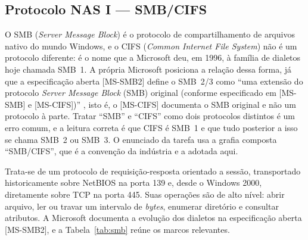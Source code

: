 \documentclass[11pt,a4paper]{article}
\begin{document}
\subsection{Protocolo NAS I --- SMB/CIFS}
\label{sec:smb}

O SMB (\textit{Server Message Block}) é o protocolo de compartilhamento de arquivos nativo do mundo
Windows, e o CIFS (\textit{Common Internet File System}) não é um protocolo diferente: é o nome que a
Microsoft deu, em 1996, à família de dialetos hoje chamada SMB~1. A própria Microsoft posiciona a
relação dessa forma, já que a especificação aberta [MS-SMB2] define o SMB~2/3 como ``uma extensão do
protocolo \textit{Server Message Block} (SMB) original (conforme especificado em [MS-SMB] e
[MS-CIFS])'' \cite{mssmb2ovw}, isto é, o [MS-CIFS] documenta o SMB original e não um protocolo à
parte. Tratar ``SMB'' e ``CIFS'' como dois protocolos distintos é um erro comum, e a leitura correta
é que CIFS é SMB~1 e que tudo posterior a isso se chama SMB~2 ou SMB~3. O enunciado da tarefa usa a
grafia composta ``SMB/CIFS'', que é a convenção da indústria e a adotada aqui.

Trata-se de um protocolo de requisição-resposta orientado a sessão, transportado historicamente sobre
NetBIOS na porta 139 e, desde o Windows 2000, diretamente sobre TCP na porta 445. Suas operações são
de alto nível: abrir arquivo, ler ou travar um intervalo de \textit{bytes}, enumerar diretório e
consultar atributos. A Microsoft documenta a evolução dos dialetos na especificação aberta [MS-SMB2],
e a Tabela~\ref{tab:smb} reúne os marcos relevantes.
\end{document}

